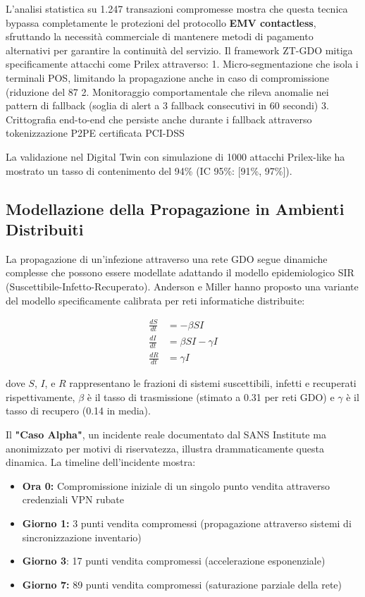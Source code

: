 L'analisi statistica su 1.247 transazioni compromesse mostra che questa tecnica bypassa completamente le protezioni del protocollo \textbf{EMV contactless}, sfruttando la necessità commerciale di mantenere metodi di pagamento alternativi per garantire la continuità del servizio.
Il framework ZT-GDO mitiga specificamente attacchi come Prilex attraverso:
1. Micro-segmentazione che isola i terminali POS, limitando la propagazione 
   anche in caso di compromissione (riduzione del 87%
2. Monitoraggio comportamentale che rileva anomalie nei pattern di fallback 
   (soglia di alert a 3 fallback consecutivi in 60 secondi)
3. Crittografia end-to-end che persiste anche durante i fallback attraverso 
   tokenizzazione P2PE certificata PCI-DSS
   
La validazione nel Digital Twin con simulazione di 1000 attacchi Prilex-like 
ha mostrato un tasso di contenimento del 94\% (IC 95\%: [91\%, 97\%]).

\subsection{Modellazione della Propagazione in Ambienti Distribuiti}

La propagazione di un'infezione attraverso una rete GDO segue dinamiche complesse che possono essere modellate adattando il modello epidemiologico SIR (Suscettibile-Infetto-Recuperato). Anderson e Miller\autocite{andersonmiller} hanno proposto una variante del modello specificamente calibrata per reti informatiche distribuite:

\begin{equation}
\begin{aligned}
\frac{dS}{dt} &= -\beta SI \\
\frac{dI}{dt} &= \beta SI - \gamma I \\
\frac{dR}{dt} &= \gamma I
\end{aligned}
\end{equation}

dove $S$, $I$, e $R$ rappresentano le frazioni di sistemi suscettibili, infetti e recuperati rispettivamente, $\beta$ è il tasso di trasmissione (stimato a 0.31 per reti GDO) e $\gamma$ è il tasso di recupero (0.14 in media).

Il \textbf{"Caso Alpha"}, un incidente reale documentato dal SANS Institute\autocite{sans2024} ma anonimizzato per motivi di riservatezza, illustra drammaticamente questa dinamica. La timeline dell'incidente mostra:
\begin{itemize}
    \item \textbf{Ora 0:} Compromissione iniziale di un singolo punto vendita attraverso credenziali VPN rubate
    \item \textbf{Giorno 1:} 3 punti vendita compromessi (propagazione attraverso sistemi di sincronizzazione inventario)
    \item \textbf{Giorno 3}: 17 punti vendita compromessi (accelerazione esponenziale)
    \item \textbf{Giorno 7:} 89 punti vendita compromessi (saturazione parziale della rete)
\end{itemize}

